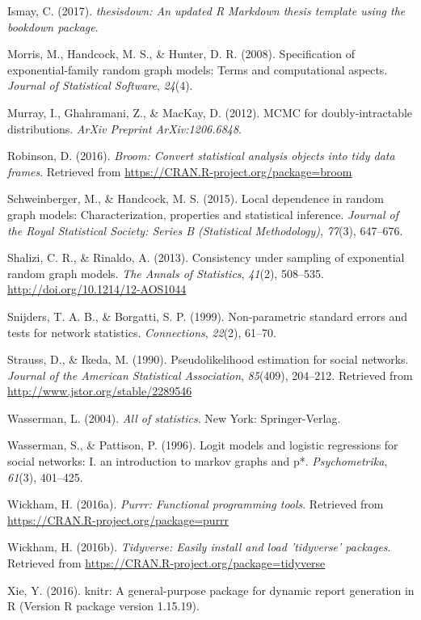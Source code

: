 \documentclass[12pt,twoside]{reedthesis}
\theoremstyle{definition}
\theoremstyle{definition}
\theoremstyle{remark}
\begin{document}
\hypertarget{ref-Ismay}{}
Ismay, C. (2017). \emph{thesisdown: An updated R Markdown thesis
template using the bookdown package}.

\hypertarget{ref-Morris2008}{}
Morris, M., Handcock, M. S., \& Hunter, D. R. (2008). Specification of
exponential-family random graph models: Terms and computational aspects.
\emph{Journal of Statistical Software}, \emph{24}(4).

\hypertarget{ref-Murray2012}{}
Murray, I., Ghahramani, Z., \& MacKay, D. (2012). MCMC for
doubly-intractable distributions. \emph{ArXiv Preprint ArXiv:1206.6848}.

\hypertarget{ref-Robinson2016}{}
Robinson, D. (2016). \emph{Broom: Convert statistical analysis objects
into tidy data frames}. Retrieved from
\url{https://CRAN.R-project.org/package=broom}

\hypertarget{ref-Schweinberger2015}{}
Schweinberger, M., \& Handcock, M. S. (2015). Local dependence in random
graph models: Characterization, properties and statistical inference.
\emph{Journal of the Royal Statistical Society: Series B (Statistical
Methodology)}, \emph{77}(3), 647--676.

\hypertarget{ref-Shalizi2013}{}
Shalizi, C. R., \& Rinaldo, A. (2013). Consistency under sampling of
exponential random graph models. \emph{The Annals of Statistics},
\emph{41}(2), 508--535. \url{http://doi.org/10.1214/12-AOS1044}

\hypertarget{ref-Snijders1999}{}
Snijders, T. A. B., \& Borgatti, S. P. (1999). Non-parametric standard
errors and tests for network statistics. \emph{Connections},
\emph{22}(2), 61--70.

\hypertarget{ref-Strauss1990}{}
Strauss, D., \& Ikeda, M. (1990). Pseudolikelihood estimation for social
networks. \emph{Journal of the American Statistical Association},
\emph{85}(409), 204--212. Retrieved from
\url{http://www.jstor.org/stable/2289546}

\hypertarget{ref-Wasserman2004}{}
Wasserman, L. (2004). \emph{All of statistics}. New York:
Springer-Verlag.

\hypertarget{ref-Wasserman1996}{}
Wasserman, S., \& Pattison, P. (1996). Logit models and logistic
regressions for social networks: I. an introduction to markov graphs and
p*. \emph{Psychometrika}, \emph{61}(3), 401--425.

\hypertarget{ref-Wickham2016a}{}
Wickham, H. (2016a). \emph{Purrr: Functional programming tools}.
Retrieved from \url{https://CRAN.R-project.org/package=purrr}

\hypertarget{ref-Wickham2016}{}
Wickham, H. (2016b). \emph{Tidyverse: Easily install and load
'tidyverse' packages}. Retrieved from
\url{https://CRAN.R-project.org/package=tidyverse}

\hypertarget{ref-Xie2016}{}
Xie, Y. (2016). knitr: A general-purpose package for dynamic report
generation in R (Version R package version 1.15.19).


\end{document}

